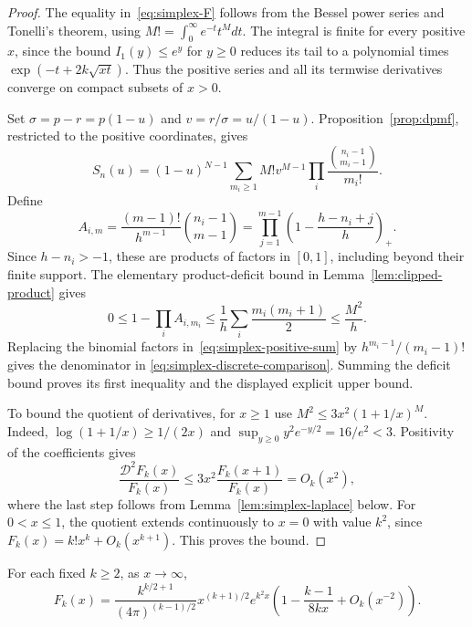 \begin{proof}
The equality in~\eqref{eq:simplex-F} follows from the Bessel power series
and Tonelli's theorem, using $M!=\int_0^\infty e^{-t}t^Mdt$.
The integral is finite for every positive $x$, since the bound $I_1(y)\le e^y$
for $y\ge0$ reduces its tail to a polynomial times
$\exp(-t+2k\sqrt{xt})$. Thus the positive series and all its termwise
derivatives converge on compact subsets of $x>0$.

Set $\sigma=p-r=p(1-u)$ and $v=r/\sigma=u/(1-u)$.
Proposition~\ref{prop:dpmf}, restricted to the positive coordinates, gives
\begin{equation}\label{eq:simplex-positive-sum}
S_n(u)=(1-u)^{N-1}\sum_{m_i\ge1}M!v^{M-1}
\prod_i\frac{\binom{n_i-1}{m_i-1}}{m_i!}.
\end{equation}
Define
\[
A_{i,m}=\frac{(m-1)!}{h^{m-1}}\binom{n_i-1}{m-1}
=\prod_{j=1}^{m-1}\left(1-\frac{h-n_i+j}{h}\right)_+.
\]
Since $h-n_i>-1$, these are products of factors in $[0,1]$, including beyond
their finite support. The elementary product-deficit bound in
Lemma~\ref{lem:clipped-product} gives
\[
0\le1-\prod_iA_{i,m_i}
\le\frac1h\sum_i\frac{m_i(m_i+1)}2\le\frac{M^2}{h}.
\]
Replacing the binomial factors in~\eqref{eq:simplex-positive-sum} by
$h^{m_i-1}/(m_i-1)!$ gives the denominator in
\eqref{eq:simplex-discrete-comparison}. Summing the deficit bound proves
its first inequality and the displayed explicit upper bound.

To bound the quotient of derivatives, for $x\ge1$ use
$M^2\le3x^2(1+1/x)^M$. Indeed,
$\log(1+1/x)\ge1/(2x)$ and
$\sup_{y\ge0}y^2e^{-y/2}=16/e^2<3$. Positivity of the coefficients gives
\[
\frac{\mathcal D^2F_k(x)}{F_k(x)}
\le3x^2\frac{F_k(x+1)}{F_k(x)}=O_k(x^2),
\]
where the last step follows from Lemma~\ref{lem:simplex-laplace} below.
For $0<x\le1$, the quotient extends continuously to $x=0$ with value
$k^2$, since $F_k(x)=k!x^k+O_k(x^{k+1})$. This proves the bound.
\end{proof}

\begin{lemma}\label{lem:simplex-laplace}
For each fixed $k\ge2$, as $x\to\infty$,
\begin{equation}\label{eq:simplex-laplace}
F_k(x)=\frac{k^{k/2+1}}{(4\pi)^{(k-1)/2}}
x^{(k+1)/2}e^{k^2x}
\left(1-\frac{k-1}{8kx}+O_k(x^{-2})\right).
\end{equation}
\end{lemma}

